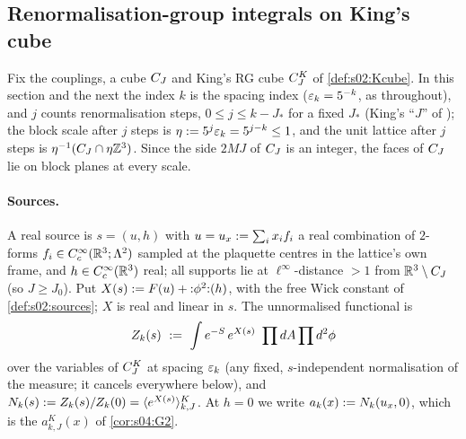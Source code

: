 \subsection{Renormalisation-group integrals on King's cube}\label{ssec:k01:setting}

Fix the couplings, a cube $C_J$ and King's RG cube $C^{K}_{J}$ of \cref{def:s02:Kcube}. In this section and the next the index $k$ is the spacing index ($\varepsilon_k=5^{-k}$, as throughout), and $j$ counts renormalisation steps, $0\le j\le k-J_*$ for a fixed $J_*$ (King's ``$J$'' of \cite[Thm.~3.1]{K1}); the block scale after $j$ steps is $\eta:=5^{j}\varepsilon_k=5^{j-k}\le1$, and the unit lattice after $j$ steps is $\eta^{-1}(C_J\cap\eta\mathbb Z^3)$. Since the side $2MJ$ of $C_J$ is an integer, the faces of $C_J$ lie on block planes at every scale.

\paragraph{Sources.} A real source is $s=(u,h)$ with $u=u_x:=\sum_ix_if_i$ a real combination of $2$-forms $f_i\in C^\infty_c(\mathbb R^3;\Lambda^2)$ sampled at the plaquette centres in the lattice's own frame, and $h\in C^\infty_c(\mathbb R^3)$ real; all supports lie at $\ell^\infty$-distance $>1$ from $\mathbb R^3\setminus C_J$ (so $J\ge J_0$). Put $X(s):= F(u)+{:}\phi^2{:}(h)$, with the free Wick constant of \cref{def:s02:sources}; $X$ is real and linear in $s$. The unnormalised functional is
\[
\Zk(s)\ \defeq\ \int e^{-S}\,e^{X(s)}\ \prod dA\prod d^2\phi
\]
over the variables of $C^{K}_{J}$ at spacing $\varepsilon_k$ (any fixed, $s$-independent normalisation of the measure; it cancels everywhere below), and $N_k(s):=Z_{k}(s)/Z_{k}(0)=\langle e^{X(s)}\rangle^{K}_{k,J}$. At $h=0$ we write $a_k(x):= N_k(u_x,0)$, which is the $a^K_{k,J}(x)$ of \cref{cor:s04:G2}.

